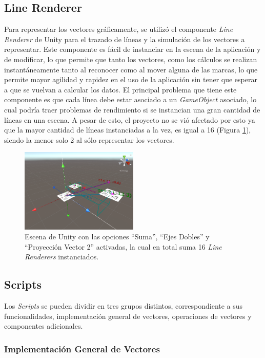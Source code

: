 \subsection{Line Renderer}
Para representar los vectores gráficamente, se utilizó el componente \textit{Line Renderer} de Unity para el trazado de líneas y la simulación de los vectores a representar. Este componente es fácil de instanciar en la escena de la aplicación y de modificar, lo que permite que tanto los vectores, como los cálculos se realizan instantáneamente tanto al reconocer como al mover alguna de las marcas, lo que permite mayor agilidad y rapidez en el uso de la aplicación sin tener que esperar a que se vuelvan a calcular los datos. El principal problema que tiene este componente es que cada línea debe estar asociado a un \textit{GameObject} asociado, lo cual podría traer problemas de rendimiento si se instancian una gran cantidad de líneas en una escena. A pesar de esto, el proyecto no se vió afectado por esto ya que la mayor cantidad de líneas instanciadas a la vez, es igual a 16 (Figura \ref{fig:vec_linerenderer}), siendo la menor solo 2 al sólo representar los vectores.

\begin{figure}[hbt!]
\centering
\includegraphics[width=0.5\textwidth]{figuras/vectores/LineRenderer.png}
\caption{\label{fig:vec_linerenderer}Escena de Unity con las opciones “Suma”, “Ejes Dobles” y “Proyección Vector 2” activadas, la cual en total suma 16 \textit{Line Renderers} instanciados.}
\end{figure}
\FloatBarrier

\subsection{Scripts} 
Los \textit{Scripts} se pueden dividir en tres grupos distintos, correspondiente a sus funcionalidades, implementación general de vectores, operaciones de vectores y componentes adicionales.

\subsubsection{Implementación General de Vectores} 

